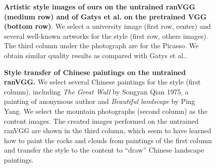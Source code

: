 \documentclass{article}
\begin{document}
\begin{figure}[htbp!]
        \caption{
					\textbf{%
                             Artistic style images of ours on the untrained ranVGG (medium row) and
						    of Gatys et al.\cite{Gatys2015texture} on the pretrained VGG (bottom row)}.
We select a university image (first row, center) and several well-known artworks for the style (first row, others images).
The third column under the photograph are for the Picasso.
We obtain similar quality results as compared with Gatys et al.\cite{Gatys2015Style}.
				}
\vspace{-2em}
\label{Fig:Cornell}
\end{figure}

\begin{figure}[htbp!]
  \vspace{-4em}
        \vspace{-1em}
\caption{
					\textbf{Style transfer of Chinese paintings on the untrained ranVGG.}
					We select several Chinese paintings for the style (first column),
					including \emph{The Great Wall} by Songyan Qian 1975, a painting of anonymous author
					and \emph{Beautiful landscape} by Ping Yang.
					We select the mountain photographs (second column) as the content images.
					The created images performed on the untrained ranVGG are shown in the third column,
                    which seem to have learned how to paint the rocks and clouds from paintings of the first column and transfer the style to the content to ``draw'' Chinese landscape paintings.
 				}
\label{Fig:ChinesePainting}
\end{figure}
\end{document}
